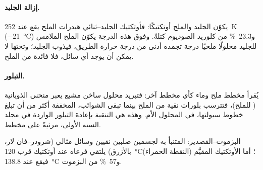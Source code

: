 \paragraph{إزالة الجليد.} يكوّن الجليد والملح أوتكتيكًا: فأوتكتيك الجليد--ثنائي هيدرات
الملح يقع عند \qty{252}{K} (\qty{-21}{\degreeCelsius}) و23.3~\% من كلوريد
الصوديوم كتلةً. وفوق هذه الدرجة يكوّن الملح الملامس للجليد
محلولًا ملحيًا درجة تجمده أدنى من درجة حرارة الطريق، فيذوب الجليد؛
وتحتها لا يمكن أن يوجد أي سائل، فلا فائدة من الملح.

\paragraph{التبلور.} يُقرأ مخطط ملح وماء كأي مخطط
آخر: فتبريد محلول ساخن مشبع يعبر منحنى الذوبانية ( للملح)، فتترسب بلورات نقية من الملح بينما
تبقى الشوائب، المخففة أكثر من أن تبلغ خطوط سيولتها، في المحلول الأم.
وهذه هي التنقية بإعادة التبلور الواردة في مجلد السنة الأولى، مرئيةً على
مخطط.

\begin{omfigure}

{\small البزموت--القصدير:  المتنبأ به لجسمين صلبين نقيين وسائل
مثالي (شرودر--فان لار، بالأزرق) يلتقي فرعاه عند أوتكتيك قرب
\qty{120}{\degreeCelsius}؛ أما الأوتكتيك المقيَّم (النقطة الحمراء) فيقع عند
\qty{138.8}{\degreeCelsius} و57~\% من البزموت.}
\end{omfigure}

